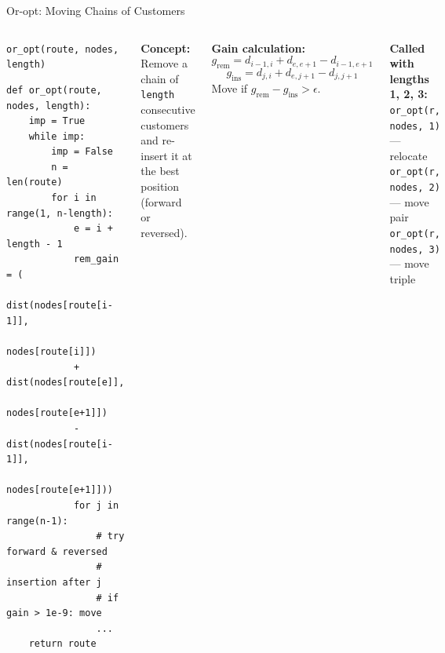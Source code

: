 \documentclass{beamer}
\begin{document}
\begin{frame}[fragile,shrink=12]{Or-opt: Moving Chains of Customers}

\begin{columns}[T]

\begin{block}{\texttt{or\_opt(route, nodes, length)}}
\begin{lstlisting}
def or_opt(route, nodes, length):
    imp = True
    while imp:
        imp = False
        n = len(route)
        for i in range(1, n-length):
            e = i + length - 1
            rem_gain = (
              dist(nodes[route[i-1]],
                   nodes[route[i]])
            + dist(nodes[route[e]],
                   nodes[route[e+1]])
            - dist(nodes[route[i-1]],
                   nodes[route[e+1]]))
            for j in range(n-1):
                # try forward & reversed
                # insertion after j
                # if gain > 1e-9: move
                ...
    return route
\end{lstlisting}
\end{block}

\small
\textbf{Concept:} Remove a chain of \texttt{length} consecutive customers and re-insert it at the best position (forward or reversed).

\vspace{0.4em}
\textbf{Gain calculation:}
\[
  g_{\text{rem}} = d_{i-1,i} + d_{e,e+1} - d_{i-1,e+1}
\]
\[
  g_{\text{ins}} = d_{j,i} + d_{e,j+1} - d_{j,j+1}
\]
Move if $g_{\text{rem}} - g_{\text{ins}} > \epsilon$.

\vspace{0.4em}
\textbf{Called with lengths 1, 2, 3:}\\
\footnotesize
\texttt{or\_opt(r, nodes, 1)} — relocate\\
\texttt{or\_opt(r, nodes, 2)} — move pair\\
\texttt{or\_opt(r, nodes, 3)} — move triple
\end{columns}

\end{frame}
\end{document}
